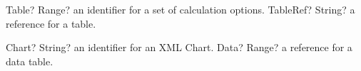 \vspace{0.3cm}
\begin{mpFunctionsExtract}
	\mpFunctionOne
	{Table? Range?  an identifier for a set of calculation options.}
	{TableRef? String? a reference for a table.}
\end{mpFunctionsExtract}


\vspace{0.3cm}
\begin{mpFunctionsExtract}
	\mpFunctionOne
	{Chart? String?  an identifier for an XML Chart.}
	{Data? Range? a reference for a data table.}
\end{mpFunctionsExtract}


